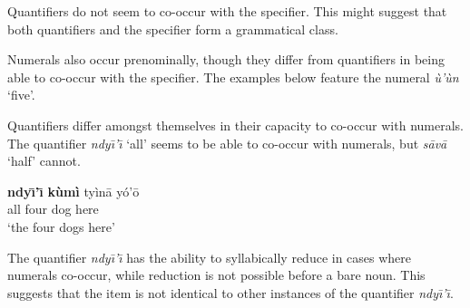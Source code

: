 \documentclass[output=paper,modfonts,nonflat]{langsci/langscibook}
\begin{document}
Quantifiers do not seem to co-occur with the specifier.  This might suggest that both quantifiers and the specifier form a grammatical class.

\z 

Numerals also occur prenominally, though they differ from quantifiers in being able to co-occur with the specifier.  The examples below feature the numeral \textit{\`u'\`un} `five'.

\z 

\z 

Quantifiers differ amongst themselves in their capacity to co-occur with numerals.  The quantifier \textit{ndy\=\i'\=\i} `all' seems to be able to co-occur with numerals, but \textit{s\=av\=a} `half' cannot.

\ea {}\label{ex:cisneros:37}
\gll
\textbf{ndy\=\i'\=\i} \textbf{k\`um\`i} ty\`in\=a y\'o'\=o\\
all four dog here\\
\glt
`the four dogs here'
\z 

\z 

The quantifier \textit{ndy\=\i'\=\i} has the ability to syllabically reduce in cases where numerals co-occur, while reduction is not possible before a bare noun.  This suggests that the item is not identical to other instances of the quantifier \textit{ndy\=\i'\=\i}.
\end{document}
